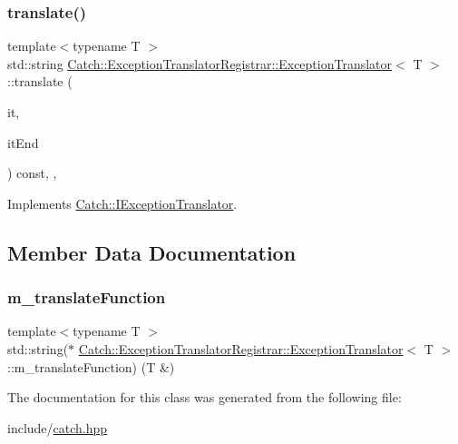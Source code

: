\subsubsection{\texorpdfstring{translate()}{translate()}}
{\footnotesize\ttfamily template$<$typename T $>$ \\
std\+::string \mbox{\hyperlink{classCatch_1_1ExceptionTranslatorRegistrar_1_1ExceptionTranslator}{Catch\+::\+Exception\+Translator\+Registrar\+::\+Exception\+Translator}}$<$ T $>$\+::translate (\begin{DoxyParamCaption}\item[{Exception\+Translators\+::const\+\_\+iterator}]{it,  }\item[{Exception\+Translators\+::const\+\_\+iterator}]{it\+End }\end{DoxyParamCaption}) const\hspace{0.3cm}{\ttfamily [inline]}, {\ttfamily [override]}, {\ttfamily [virtual]}}



Implements \mbox{\hyperlink{structCatch_1_1IExceptionTranslator_a2a554b96ed5ed411e7c796b6b42837a5}{Catch\+::\+I\+Exception\+Translator}}.



\subsection{Member Data Documentation}
\mbox{\label{classCatch_1_1ExceptionTranslatorRegistrar_1_1ExceptionTranslator_a488013ff0869785c9d041443fbf9a757}} 
\subsubsection{\texorpdfstring{m\+\_\+translate\+Function}{m\_translateFunction}}
{\footnotesize\ttfamily template$<$typename T $>$ \\
std\+::string($\ast$ \mbox{\hyperlink{classCatch_1_1ExceptionTranslatorRegistrar_1_1ExceptionTranslator}{Catch\+::\+Exception\+Translator\+Registrar\+::\+Exception\+Translator}}$<$ T $>$\+::m\+\_\+translate\+Function) (T \&)\hspace{0.3cm}{\ttfamily [protected]}}



The documentation for this class was generated from the following file\+:\begin{DoxyCompactItemize}
\item 
include/\mbox{\hyperlink{catch_8hpp}{catch.\+hpp}}\end{DoxyCompactItemize}
